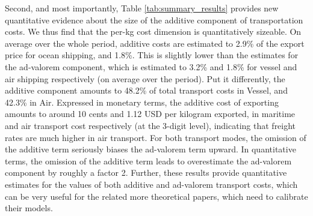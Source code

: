 \documentclass[a4paper,11pt]{article}
\begin{document}
Second, and most importantly, Table \ref{tab:summary_results} provides new quantitative evidence about the size of the additive component of transportation costs. We thus find that the per-kg cost dimension is quantitatively sizeable. On average over the whole period, additive costs are estimated to 2.9\% of the export price for ocean shipping, and 1.8\%. This is slightly lower than the estimates for the ad-valorem component, which is estimated to 3.2\% and 1.8\% for vessel and air shipping respectively (on average over the period). Put it differently, the additive component amounts to 48.2\% of total transport costs in Vessel, and 42.3\% in Air. Expressed in monetary terms, the additive cost of exporting amounts to around 10 cents and 1.12 USD per kilogram exported, in maritime and air transport cost respectively (at the 3-digit level), indicating that freight rates are much higher in air transport. For both transport modes, the omission of the additive term seriously biases the ad-valorem term upward. In quantitative terms, the omission of the additive term leads to overestimate the ad-valorem component by roughly a factor 2. Further, these results provide quantitative estimates for the values of both additive and ad-valorem transport costs, which can be very useful for the related more theoretical papers, which need to calibrate their models.\smallskip
\end{document}
